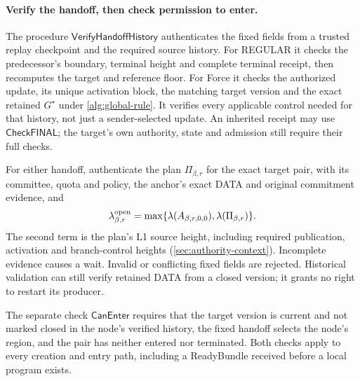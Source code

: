 \documentclass[11pt,a4paper]{article}
\newcommand{\tagg}[1]{\ensuremath{\mathsf{#1}}}
\begin{document}
\paragraph{Verify the handoff, then check permission to enter.}
\label{sec:verify-handoff}
The procedure $\tagg{VerifyHandoffHistory}$ authenticates the fixed
fields from a trusted replay checkpoint and the required source
history. For REGULAR it checks the predecessor's boundary, terminal
height and complete terminal receipt, then recomputes the target and
reference floor. For Force it checks the authorized update, its unique
activation block, the matching target version and the exact retained
$G^\star$ under \cref{alg:global-rule}. It verifies every applicable
control needed for that history, not just a sender-selected update.
An inherited receipt may use \tagg{CheckFINAL}; the target's own
authority, state and admission still require their full checks.

For either handoff, authenticate the plan $\Pi_{\beta,r}$ for the exact
target pair, with its committee, quota and policy, the anchor's exact
DATA and original commitment evidence, and
\[
 \lambda^{\rm open}_{\beta,r}
 =\max\{\lambda(A_{\beta,r,0,0}),
         \lambda(\Pi_{\beta,r})\}.
\]
The second term is the plan's L1 source height, including required
publication, activation and branch-control heights (\cref{sec:authority-context}).
Incomplete evidence causes a wait. Invalid or conflicting fixed fields
are rejected. Historical validation can still verify retained DATA
from a closed version; it grants no right to restart its producer.

\label{sec:can-enter}
The separate check $\tagg{CanEnter}$ requires that the target version
is current and not marked closed in the node's verified history,
the fixed handoff selects the node's region, and the pair has neither
entered nor terminated. Both checks apply to every creation and entry
path, including a ReadyBundle received before a local program exists.
\end{document}
